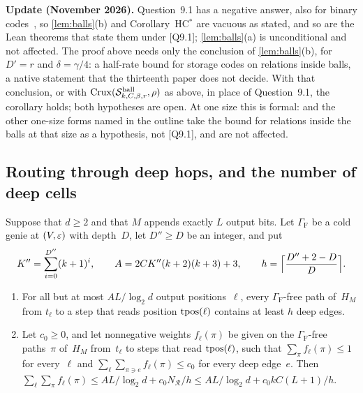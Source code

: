 \textbf{Update (November 2026).} Question~9.1 has a negative answer, also for binary
codes~\cite[Theorem~A and Corollary~A$'$]{StorageCodes2026}, so \cref{lem:balls}(b) and Corollary~HC$^*$ are vacuous as
stated, and so are the Lean theorems that state them under [Q9.1]; \cref{lem:balls}(a) is unconditional and not
affected. The proof above needs only the conclusion of \cref{lem:balls}(b), for $D'=r$ and $\delta=\gamma/4$: a half-rate
bound for storage codes on relations inside balls, a native statement that the thirteenth paper does not decide. With
that conclusion, or with $\mathrm{Crux}(\mathcal S^{\mathrm{ball}}_{k,C,\beta,r},\rho)$ as above, in place of Question~9.1, the corollary holds; both
hypotheses are open. At one size this is formal:  and the other one-size forms named
in the outline take the bound for relations inside the balls at that size as a hypothesis, not [Q9.1], and are not
affected.

\subsection{Routing through deep hops, and the number of deep cells}\label{sec:hop-routing}

\begin{proposition}\label{prop:hop-routing}
Suppose that $d\ge2$ and that $M$ appends exactly $L$ output bits. Let $\Gamma_{\mathrm F}$ be a cold genie at $(V,\varepsilon)$
with depth~$D$, let $D''\ge D$ be an integer, and put
\[
  K''=\sum_{i=0}^{D''}(k+1)^i,\qquad A=2CK''(k+2)(k+3)+3,\qquad h=\Bigl\lceil\frac{D''+2-D}D\Bigr\rceil.
\]
\begin{enumerate}[label=(\alph*)]
\item For all but at most $AL/\log_2d$ output positions~$\ell$, every $\Gamma_{\mathrm F}$-free path of~$H_M$ from
$t_\ell$ to a step that reads position $\operatorname{tpos}(\ell)$ contains at least $h$ deep edges.
\item Let $c_0\ge0$, and let nonnegative weights $f_\ell(\pi)$ be given on the $\Gamma_{\mathrm F}$-free paths~$\pi$
of~$H_M$ from~$t_\ell$ to steps that read $\operatorname{tpos}(\ell)$, such that $\sum_\pi f_\ell(\pi)\le1$ for every~$\ell$ and
$\sum_\ell\sum_{\pi\ni e}f_\ell(\pi)\le c_0$ for every deep edge~$e$. Then
$\sum_\ell\sum_\pi f_\ell(\pi)\le AL/\log_2d+c_0N_{\mathcal R}/h\le AL/\log_2d+c_0kC(L+1)/h$.
\end{enumerate}
\end{proposition}

